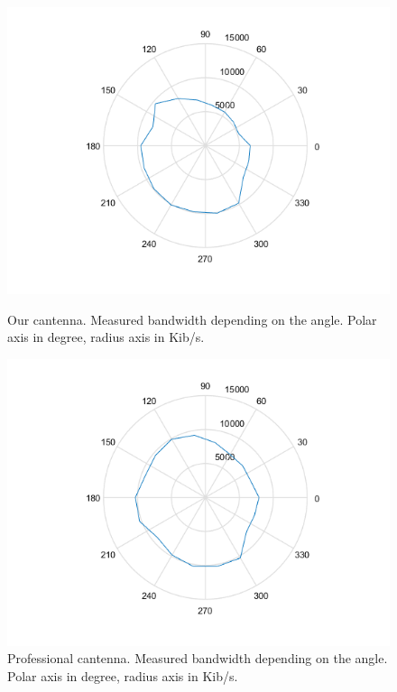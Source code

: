 			\begin{figure}\begin{center}
					\includegraphics[width=\figurewidth]{plots/polar_can_b.png}
					\caption{Our cantenna. Measured bandwidth depending on the angle. Polar axis in degree, radius axis in Kib/s.}
					\label{img:ang:band:can}
					
					\includegraphics[width=\figurewidth]{plots/polar_prof_b.png}
					\caption{Professional cantenna. Measured bandwidth depending on the angle. Polar axis in degree, radius axis in Kib/s.}
					\label{img:ang:band:prof}
					

\end{center}
\end{figure}
